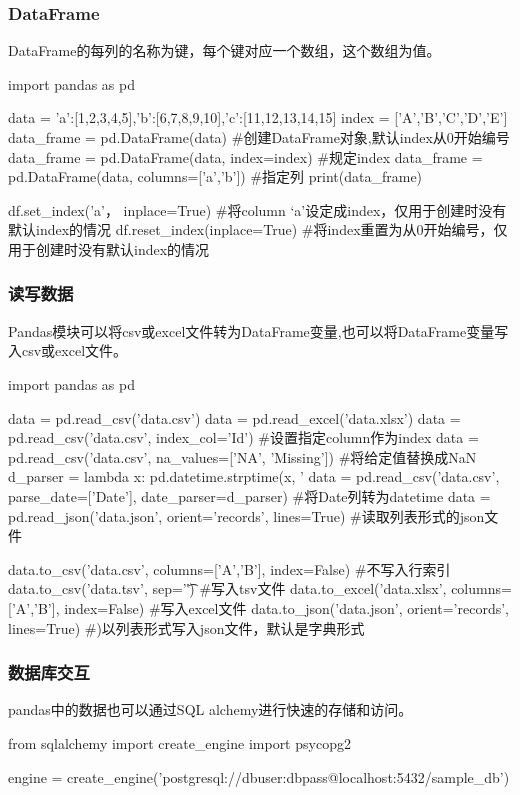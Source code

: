     \subsubsection{DataFrame}
      DataFrame的每列的名称为键，每个键对应一个数组，这个数组为值。
      \begin{codeblock}[language=python, caption={Create a dataframe}]
        import pandas as pd

        data = {'a':[1,2,3,4,5],'b':[6,7,8,9,10],'c':[11,12,13,14,15]}
        index = ['A','B','C','D','E']
        data_frame = pd.DataFrame(data) #创建DataFrame对象,默认index从0开始编号
        data_frame = pd.DataFrame(data, index=index) #规定index
        data_frame = pd.DataFrame(data, columns=['a','b']) #指定列
        print(data_frame)

        df.set_index('a'， inplace=True) #将column `a'设定成index，仅用于创建时没有默认index的情况
        df.reset_index(inplace=True) #将index重置为从0开始编号，仅用于创建时没有默认index的情况
      \end{codeblock}

    \subsubsection{读写数据}
      Pandas模块可以将csv或excel文件转为DataFrame变量,也可以将DataFrame变量写入csv或excel文件。
      \begin{codeblock}[language=python, caption={Read and write files using Pandas}]
        import pandas as pd

        data = pd.read_csv('data.csv')
        data = pd.read_excel('data.xlsx')
        data = pd.read_csv('data.csv', index_col='Id') #设置指定column作为index
        data = pd.read_csv('data.csv', na_values=['NA', 'Missing']) #将给定值替换成NaN
        d_parser = lambda x: pd.datetime.strptime(x, '%
        data = pd.read_csv('data.csv', parse_date=['Date'], date_parser=d_parser) 
            #将Date列转为datetime
        data = pd.read_json('data.json', orient='records', lines=True) #读取列表形式的json文件

        data.to_csv('data.csv', columns=['A','B'], index=False) #不写入行索引
        data.to_csv('data.tsv', sep='\t') #写入tsv文件
        data.to_excel('data.xlsx', columns=['A','B'], index=False) #写入excel文件
        data.to_json('data.json', orient='records', lines=True) #)以列表形式写入json文件，默认是字典形式
      \end{codeblock}

    \subsubsection{数据库交互}
      pandas中的数据也可以通过SQL alchemy进行快速的存储和访问。
      \begin{codeblock}[language=python, caption={pandas \& database}]
        from sqlalchemy import create_engine
        import psycopg2

        engine = create_engine('postgresql://dbuser:dbpass@localhost:5432/sample_db')
      \end{codeblock}

